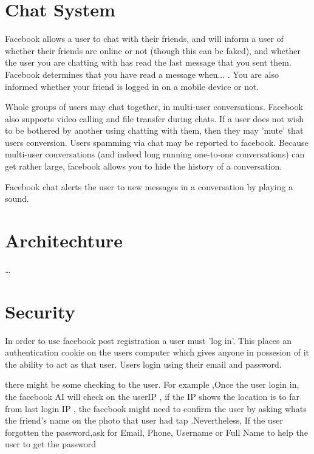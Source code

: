\section{Chat System}
Facebook allows a user to chat with their friends, and will inform a user of
whether their friends are online or not (though this can be faked), and whether
the user you are chatting with has read the last message that you sent them.
Facebook determines that you have read a message when... . You are also informed whether your friend is logged in on a mobile
device or not.

Whole groups of users may chat together, in multi-user conversations. Facebook
also supports video calling and file transfer during chats. If a user does not
wish to be bothered by another using chatting with them, then they may 'mute'
that users conversion. Users spamming via chat may be reported to facebook.
Because multi-user conversations (and indeed long running one-to-one
conversations) can get rather large, facebook allows you to hide the history of
a conversation.

Facebook chat alerts the user to new messages in a conversation by playing a
sound.

\section{Architechture}
\ldots

\section{Security}
In order to use facebook post registration a user must 'log in'. This places an
authentication cookie on the users computer which gives anyone in possesion of
it the ability to act as that user. Users login using their email and password.

there might be some checking to the user. For example ,Once the user login in,
the facebook AI will check on the userIP , if the IP shows the location is to
far from last login IP , the facebook might need to confirm the user by asking
whats the friend's name on the photo that user had tap .Nevertheless, If the
user forgotten the password,ask for Email, Phone, Username or Full Name to help
the user to get the password
